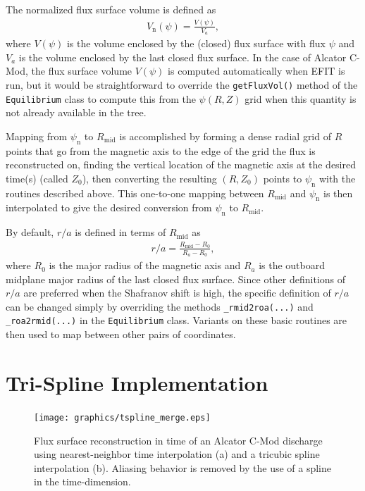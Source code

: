 \documentclass[12pt,floatfix,showpacs]{revtex4-1}
\begin{document}
The normalized flux surface volume is defined as
\begin{gather}
	V_{\text{n}}(\psi) = \frac{V(\psi)}{V_{a}},
\end{gather}
where $V(\psi)$ is the volume enclosed by the (closed) flux surface with flux $\psi$ and $V_{a}$ is the volume enclosed by the last closed flux surface.
In the case of Alcator C-Mod, the flux surface volume $V(\psi)$ is computed automatically when EFIT is run, but it would be straightforward to override the \verb|getFluxVol()| method of the \verb|Equilibrium| class to compute this from the $\psi(R, Z)$ grid when this quantity is not already available in the tree.

Mapping from $\psi_{\text{n}}$ to $R_{\text{mid}}$ is accomplished by forming a dense radial grid of $R$ points that go from the magnetic axis to the edge of the grid the flux is reconstructed on, finding the vertical location of the magnetic axis at the desired time(s) (called $Z_{0}$), then converting the resulting $(R, Z_{0})$ points to $\psi_{\text{n}}$ with the routines described above.
This one-to-one mapping between $R_{\text{mid}}$ and $\psi_{\text{n}}$ is then interpolated to give the desired conversion from $\psi_{\text{n}}$ to $R_{\text{mid}}$.

By default, $r/a$ is defined in terms of $R_{\text{mid}}$ as
\begin{gather}
	r/a = \frac{R_{\text{mid}} - R_{0}}{R_{a} - R_{0}},
\end{gather}
where $R_{0}$ is the major radius of the magnetic axis and $R_{a}$ is the outboard midplane major radius of the last closed flux surface.
Since other definitions of $r/a$ are preferred when the Shafranov shift is high, the specific definition of $r/a$ can be changed simply by overriding the methods \verb|_rmid2roa(...)| and \verb|_roa2rmid(...)| in the \verb|Equilibrium| class.
Variants on these basic routines are then used to map between other pairs of coordinates.

\section{Tri-Spline Implementation}\label{sec:trispline}

\begin{figure}[ht]
 \texttt{[image: graphics/tspline\_merge.eps]}
 \caption{Flux surface reconstruction in time of an Alcator C-Mod discharge using nearest-neighbor time interpolation (a) and a tricubic spline interpolation (b). Aliasing behavior is removed by the use of a spline in the time-dimension. }
 \label{fig:tspline}
\end{figure}
\end{document}
